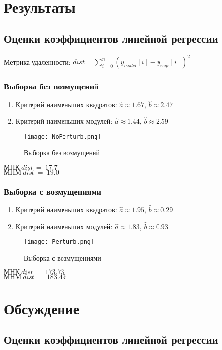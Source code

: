 \documentclass{article}
\begin{document}
\section{Результаты}
\subsection{Оценки коэффициентов линейной регрессии}
	
	\noindent Метрика удаленности: $dist = \sum_{i=0}^{n}(y_{model}[i]-y_{regr}[i])^2$
	\subsubsection{Выборка без возмущений}
		\begin{enumerate}
			\item{Критерий наименьших квадратов:}
			$\hat{a}\approx 1.67$, $\hat{b}\approx 2.47$
			\item{Критерий наименьших модулей:}
			$\hat{a}\approx 1.44$, $\hat{b}\approx 2.59$
		\end{enumerate}
		\begin{figure}[H]
			\centering
			\texttt{[image: NoPerturb.png]}
			\caption{Выборка без возмущений}
			\label{w/o_pert}
		\end{figure}
		$МНК~dist~=~17.7$ \\
		$МНМ~dist~=~19.0$
	
	\subsubsection{Выборка с возмущениями}
		\begin{enumerate}
			\item{Критерий наименьших квадратов:}
			$\hat{a}\approx 1.95$, $\hat{b}\approx 0.29 $
			\item{Критерий наименьших модулей:}
			$\hat{a}\approx 1.83$, $\hat{b}\approx 0.93$
		\end{enumerate}
		\begin{figure}[H]
			\centering
			\texttt{[image: Perturb.png]}
			\caption{Выборка с возмущениями}
			\label{w_pert}
		\end{figure}
		$МНК~dist~=~173.73$ \\
		$МНМ~dist~=~183.49$

\section{Обсуждение}
\subsection{Оценки коэффициентов линейной регрессии}
	
\end{document}
